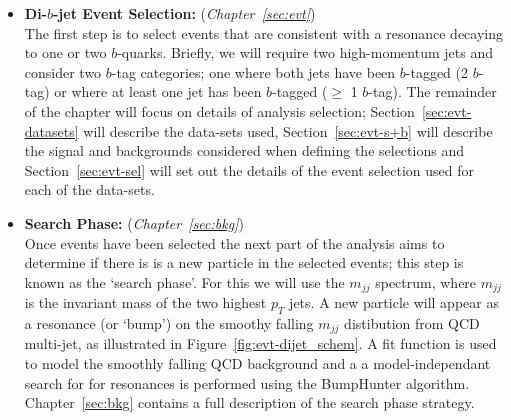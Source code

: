 \begin{itemize}[leftmargin=*]
\item\textbf{Di-$b$-jet Event Selection:} (\textit{Chapter~\ref{sec:evt}})\\
  The first step is to select events that are consistent with a resonance decaying to one or two $b$-quarks.
  Briefly, we will require two high-momentum jets and consider two $b$-tag categories;
  one where both jets have been $b$-tagged (2 $b$-tag) or where at least one jet has been $b$-tagged ($\geq$ 1 $b$-tag).
  The remainder of the chapter will focus on details of analysis selection;
  Section~\ref{sec:evt-datasets} will describe the data-sets used,
  Section~\ref{sec:evt-s+b} will describe the signal and backgrounds
  considered when defining the selections
  and Section~\ref{sec:evt-sel} will set out
  the details of the event selection used for each of the data-sets.
  \\
\item\textbf{Search Phase:} (\textit{Chapter~\ref{sec:bkg}})\\
  Once events have been selected the next part of the analysis aims to determine if there is
  is a new particle in the selected events; this step is known as the `search phase'.
  For this we will use the $m_{jj}$ spectrum, where $m_{jj}$ is the invariant mass of the two highest $p_T$ jets.
  A new particle will appear as a resonance (or `bump') on the smoothy falling
  $m_{jj}$ distibution from QCD multi-jet, as illustrated in Figure~\ref{fig:evt-dijet_schem}.
  A fit function is used to model the smoothly falling QCD background and a
  a model-independant search for for resonances is performed using the BumpHunter algorithm.
  Chapter~\ref{sec:bkg} contains a full description of the search phase strategy.
  \\
  

\end{itemize}
